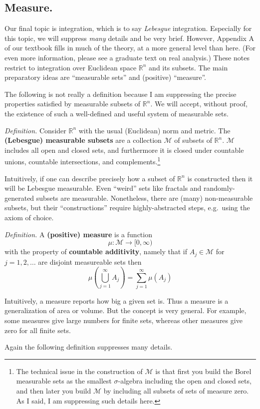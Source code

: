 \documentclass[12pt]{article}
\newcommand{\cM}{\mathcal{M}}
\newcommand{\RR}{\mathbb{R}}
\newcommand{\sect}[1]{\subsection*{#1.}}
\newcommand{\defin}{\emph{Definition.}\,\,}
\begin{document}
\sect{Measure}

Our final topic is integration, which is to say \emph{Lebesgue} integration.  Especially for this topic, we will suppress \emph{many} details and be very brief.  However, Appendix A of our textbook fills in much of the theory, at a more general level than here.  (For even more information, please see a graduate text on real analysis.)  These notes restrict to integration over Euclidean space $\RR^n$ and its subsets.  The main preparatory ideas are ``measurable sets'' and (positive) ``measure''.

The following is not really a definition because I am suppressing the precise properties satisfied by measurable subsets of $\RR^n$.  We will accept, without proof, the existence of such a well-defined and useful system of measurable sets.

\defin Consider $\RR^n$ with the usual (Euclidean) norm and metric.  The \textbf{(Lebesgue) measurable subsets} are a collection $\cM$ of subsets of $\RR^n$.  $\cM$ includes all open and closed sets, and furthermore it is closed under countable unions, countable intersections, and complements.\footnote{The technical issue in the construction of $\cM$ is that first you build the Borel measurable sets as the smallest $\sigma$-algebra including the open and closed sets, and then later you build $\cM$ by including all subsets of sets of measure zero.  As I said, I am suppressing such details here.}

Intuitively, if one can describe precisely how a subset of $\RR^n$ is constructed then it will be Lebesgue measurable.  Even ``weird'' sets like fractals and randomly-generated subsets are measurable.  Nonetheless, there are (many) non-measurable subsets, but their ``constructions'' require highly-abstracted steps, e.g.~using the axiom of choice.

\defin A \textbf{(positive) measure} is a function
	$$\mu : \cM \to [0,\infty)$$
with the property of \textbf{countable additivity}, namely that if $A_j \in \cM$ for $j=1,2,\dots$ are disjoint measureable sets then
	$$\mu\left(\bigcup_{j=1}^\infty A_j\right) = \sum_{j=1}^\infty \mu(A_j)$$

Intuitively, a measure reports how big a given set is.  Thus a measure is a generalization of area or volume.  But the concept is very general.  For example, some measures give large numbers for finite sets, whereas other measures give zero for all finite sets.

Again the following definition suppresses many details.
\end{document}

